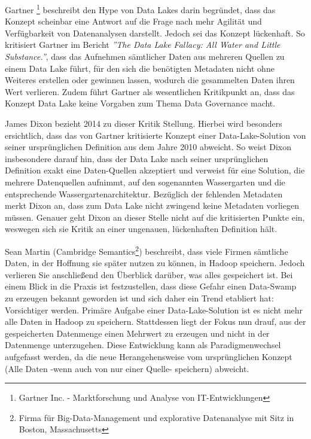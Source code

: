 \documentclass[twoside,twocolumn]{article}
\begin{document}
Gartner \footnote{Gartner Inc. - Marktforschung und Analyse von IT-Entwicklungen} beschreibt den Hype von Data Lakes darin begründet, dass das Konzept scheinbar eine Antwort auf die Frage nach mehr Agilität und Verfügbarkeit von Datenanalysen darstellt. Jedoch sei das Konzept lückenhaft. So kritisiert Gartner im Bericht \textit{''The Data Lake Fallacy: All Water and Little Substance.''}, dass das Aufnehmen sämtlicher Daten aus mehreren Quellen zu einem Data Lake führt, für den sich die benötigten Metadaten nicht ohne Weiteres erstellen oder gewinnen lassen, wodurch die gesammelten Daten ihren Wert verlieren. Zudem führt Gartner als wesentlichen Kritikpunkt an, dass das Konzept Data Lake keine Vorgaben zum Thema Data Governance macht.\cite{src3}

James Dixon bezieht 2014 zu dieser Kritik Stellung. Hierbei wird besonders ersichtlich, dass das von Gartner kritisierte Konzept einer Data-Lake-Solution von seiner ursprünglichen Definition aus dem Jahre 2010 abweicht. \cite{src14} So weist Dixon insbesondere darauf hin, dass der Data Lake nach seiner ursprünglichen Definition exakt eine Daten-Quellen akzeptiert und verweist für eine Solution, die mehrere Datenquellen aufnimmt, auf den sogenannten Wassergarten und die entsprechende Wassergartenarchitektur.\cite{src15} Bezüglich der fehlenden Metadaten merkt Dixon an, dass zum Data Lake nicht zwingend keine Metadaten vorliegen müssen. Genauer geht Dixon an dieser Stelle nicht auf die kritisierten Punkte ein, weswegen sich sie Kritik an einer ungenauen, lückenhaften Definition hält.

Sean Martin (Cambridge Semantics\footnote{Firma für Big-Data-Management und explorative Datenanalyse mit Sitz in Boston, Massachusetts}) beschreibt, dass viele Firmen sämtliche Daten, in der Hoffnung sie später nutzen zu können, in Hadoop speichern. Jedoch verlieren Sie anschließend den Überblick darüber, was alles gespeichert ist.
Bei einem Blick in die Praxis ist festzustellen, dass diese Gefahr einen Data-Swamp zu erzeugen bekannt geworden ist und sich daher ein Trend etabliert hat: Vorsichtiger werden. Primäre Aufgabe einer Data-Lake-Solution ist es nicht mehr alle Daten in Hadoop zu speichern. Stattdessen liegt der Fokus nun drauf, aus der gespeicherten Datenmenge einen Mehrwert zu erzeugen und nicht in der Datenmenge unterzugehen. \cite{src1} Diese Entwicklung kann als Paradigmenwechsel aufgefasst werden, da die neue Herangehensweise vom ursprünglichen Konzept (Alle Daten -wenn auch von nur einer Quelle- speichern) abweicht.
\end{document}
